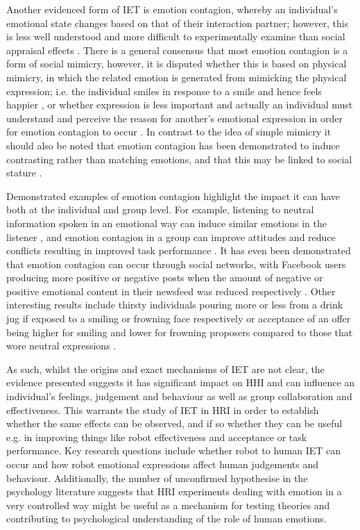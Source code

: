 \documentclass[11pt,a4paper]{report}
\begin{document}
Another evidenced form of IET is emotion contagion, whereby an individual's emotional state changes based on that of their interaction partner; however, this is less well understood and more difficult to experimentally examine than social appraisal effects \cite{parkinson2011interpersonal}. There is a general consensus that most emotion contagion is a form of social mimicry, however, it is disputed whether this is based on physical mimicry, in which the related emotion is generated from mimicking the physical expression; i.e. the individual smiles in response to a smile and hence feels happier \cite{strack1988inhibiting}, or whether expression is less important and actually an individual must understand and perceive the reason for another's emotional expression in order for emotion contagion to occur \cite{tamietto2009unseen}. In contrast to the idea of simple mimicry it should also be noted that emotion contagion has been demonstrated to induce contrasting rather than matching emotions, and that this may be linked to social stature \cite{tiedens2003power}.

Demonstrated examples of emotion contagion highlight the impact it can have both at the individual and group level. For example, listening to neutral information spoken in an emotional way can induce similar emotions in the listener \cite{neumann2000mood}, and emotion contagion in a group can improve attitudes and reduce conflicts resulting in improved task performance \cite{barsade2002ripple}. It has even been demonstrated that emotion contagion can occur through social networks, with Facebook users producing more positive or negative posts when the amount of negative or positive emotional content in their newsfeed was reduced respectively \cite{kramer2014experimental}. Other interesting results include thirsty individuals pouring more or less from a drink jug if exposed to a smiling or frowning face respectively \cite{winkielman2005unconscious} or acceptance of an offer being higher for smiling and lower for frowning proposers compared to those that wore neutral expressions \cite{mussel2013value}. 

As such, whilst the origins and exact mechanisms of IET are not clear, the evidence presented suggests it has significant impact on HHI and can influence an individual's feelings, judgement and behaviour as well as group collaboration and effectiveness. This warrants the study of IET in HRI in order to establish whether the same effects can be observed, and if so whether they can be useful e.g. in improving things like robot effectiveness and acceptance or task performance. Key research questions include whether robot to human IET can occur and how robot emotional expressions affect human judgements and behaviour. Additionally, the number of unconfirmed hypothesise in the psychology literature suggests that HRI experiments dealing with emotion in a very controlled way might be useful as a mechanism for testing theories and contributing to psychological understanding of the role of human emotions. 
\end{document}
